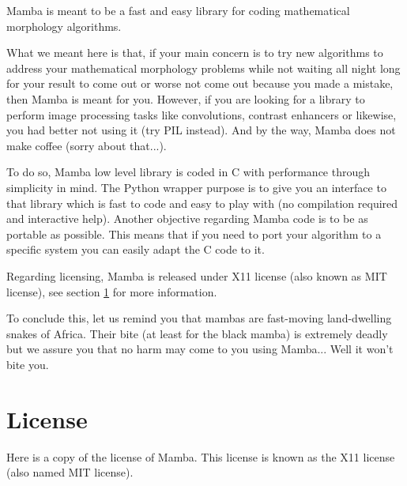 \documentclass[a4paper,10pt,oneside]{article}
\begin{document}
Mamba is meant to be a fast and easy library for coding mathematical morphology 
algorithms.

What we meant here is that, if your main concern is to try new algorithms to 
address your mathematical morphology problems while not waiting all night long 
for your result to come out or worse not come out because you made a mistake, 
then Mamba is meant for you. However, if you are looking for a library to perform
image processing tasks like convolutions, contrast enhancers or likewise, you 
had better not using it (try PIL instead). And by the way, Mamba does not make 
coffee (sorry about that...).

To do so, Mamba low level library is coded in C with performance through
simplicity in mind. The Python wrapper purpose is to give you an interface to 
that library which is fast to code and easy to play with (no compilation required 
and interactive help). Another objective regarding Mamba code is to be as 
portable as possible. This means that if you need to port your algorithm to a 
specific system you can easily adapt the C code to it.

Regarding licensing, Mamba is released under X11 license (also known as MIT 
license), see section \ref{cha:License} for more information.

To conclude this, let us remind you that mambas are fast-moving land-dwelling 
snakes of Africa. Their bite (at least for the black mamba) is extremely deadly 
but we assure you that no harm may come to you using Mamba... Well it won't bite
you.

\pagebreak

\section{License}
\label{cha:License}

Here is a copy of the license of Mamba. This license is known as the X11 license
(also named MIT license).

\vspace{0.5cm}
\end{document}
